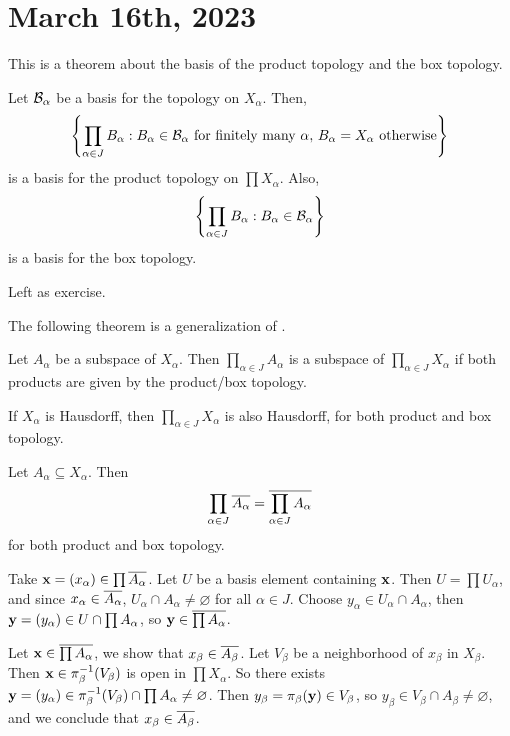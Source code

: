 \section*{March 16th, 2023}

This is a theorem about the basis of the product topology and the box topology.

 Let \(\mc{B}_\alpha\) be a basis for the topology on \(X_\alpha\). Then,
\[
    \left\{\prod_{\alpha \in J} B_\alpha : B_\alpha \in \mc{B}_\alpha \text{ for finitely many } \alpha,\, B_\alpha = X_\alpha \text{ otherwise}\right\}
\]
is a basis for the product topology on \(\prod X_\alpha\). Also,
\[
    \left\{\prod_{\alpha \in J} B_\alpha : B_\alpha \in \mc{B}_\alpha\right\}
\]
is a basis for the box topology.

\pf Left as exercise.

The following theorem is a generalization of .

 Let \(A_\alpha\) be a subspace of \(X_\alpha\). Then \(\prod_{\alpha \in J} A_\alpha\) is a subspace of \(\prod_{\alpha \in J} X_\alpha\) if both products are given by the product/box topology.

 If \(X_\alpha\) is Hausdorff, then \(\prod_{\alpha \in J} X_\alpha\) is also Hausdorff, for both product and box topology.

 Let \(A_\alpha \subseteq X_\alpha\). Then
\[
    \prod_{\alpha \in J} \cl{A_\alpha} = \cl{\prod_{\alpha \in J} A_\alpha}
\]
for both product and box topology.

\pf \note{\(\subseteq\)} Take \(\bf{x} = (x_\alpha) \in \prod \cl{A_\alpha}\). Let \(U\) be a basis element containing \(\bf{x}\). Then \(U = \prod U_\alpha\), and since \(x_\alpha \in \cl{A_\alpha}\), \(U_\alpha \cap A_\alpha \neq \varnothing\) for all \(\alpha \in J\). Choose \(y_\alpha \in U_\alpha \cap A_\alpha\), then \(\bf{y} = (y_\alpha) \in U\cap \prod A_\alpha\), so \(\bf{y} \in \cl{\prod A_\alpha}\).

\note{\(\supseteq\)} Let \(\bf{x} \in \cl{\prod A_\alpha}\), we show that \(x_\beta \in \cl{A_\beta}\). Let \(V_\beta\) be a neighborhood of \(x_\beta\) in \(X_\beta\). Then \(\bf{x} \in \pi_{\beta}\inv(V_\beta)\) is open in \(\prod X_\alpha\). So there exists \(\bf{y} = (y_\alpha) \in \pi_\beta\inv(V_\beta) \cap \prod A_\alpha \neq \varnothing\). Then \(y_\beta = \pi_\beta(\bf{y}) \in V_\beta\), so \(y_\beta \in V_\beta \cap A_\beta \neq \varnothing\), and we conclude that \(x_\beta \in \cl{A_\beta}\).

